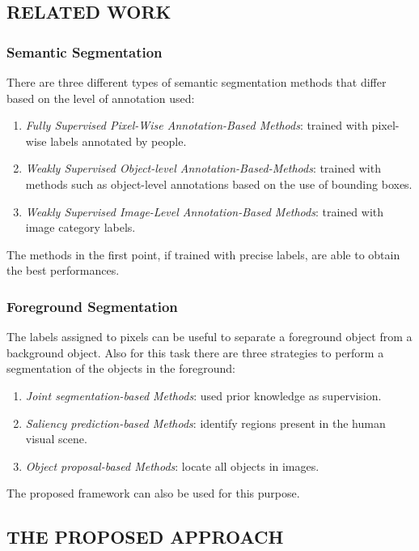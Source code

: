 \subsection{RELATED WORK}
\subsubsection{Semantic Segmentation}
There are three different types of semantic segmentation methods that differ 
based on the level of annotation used:
\begin{enumerate}
    \item \emph{Fully Supervised Pixel-Wise Annotation-Based Methods}: trained with 
    pixel-wise labels annotated by people.
    \item \emph{Weakly Supervised Object-level Annotation-Based-Methods}: trained with 
    methods such as object-level annotations based on the use of bounding 
    boxes.
    \item \emph{Weakly Supervised Image-Level Annotation-Based Methods}: trained 
    with image category labels.
\end{enumerate}
The methods in the first point, if trained with precise labels, are able to 
obtain the best performances.

\subsubsection{Foreground Segmentation}
The labels assigned to pixels can be useful to separate a foreground object 
from a background object. Also for this task there are three strategies to 
perform a segmentation of the objects in the foreground:
\begin{enumerate}
    \item \emph{Joint segmentation-based Methods}: used prior knowledge as supervision.
    \item \emph{Saliency prediction-based Methods}: identify regions present in the human 
    visual scene.
    \item \emph{Object proposal-based Methods}: locate all objects in images.
\end{enumerate}
The proposed framework can also be used for this purpose.

\subsection{THE PROPOSED APPROACH}
